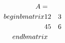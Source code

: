 \documentclass[preview]{standalone}
\begin{document}
\begin{align*}
\special{dvisvgm:raw <g id='unique000'>}A = \\begin{bmatrix} 1 & 2 & 3 \\ 4 & 5 & 6 \\end{bmatrix}\special{dvisvgm:raw </g>}
\end{align*}
\end{document}
